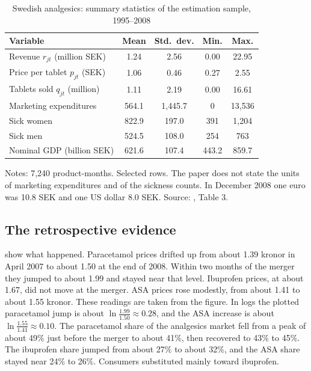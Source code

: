\begin{table}[htbp]
\centering
\caption{Swedish analgesics: summary statistics of the estimation sample, 1995--2008}
\label{tab:11-bv-sum}
\footnotesize
\begin{tabular}{@{}lcccc@{}}
\toprule
Variable & Mean & Std.\ dev. & Min. & Max. \\
\midrule
Revenue $r_{jt}$ (million SEK) & 1.24 & 2.56 & 0.00 & 22.95 \\
Price per tablet $p_{jt}$ (SEK) & 1.06 & 0.46 & 0.27 & 2.55 \\
Tablets sold $q_{jt}$ (million) & 1.11 & 2.19 & 0.00 & 16.61 \\
Marketing expenditures & 564.1 & 1{,}445.7 & 0 & 13{,}536 \\
Sick women & 822.9 & 197.0 & 391 & 1{,}204 \\
Sick men & 524.5 & 108.0 & 254 & 763 \\
Nominal GDP (billion SEK) & 621.6 & 107.4 & 443.2 & 859.7 \\
\bottomrule
\end{tabular}

\smallskip
\begin{minipage}{0.8\linewidth}
\footnotesize Notes: 7,240 product-months. Selected rows. The paper does not state the units of marketing
expenditures and of the sickness counts. In December 2008 one euro was 10.8 SEK and one US dollar 8.0 SEK. Source:
\citet{BjornerstedtVerboven2013}, Table 3.
\end{minipage}
\end{table}

\subsection{The retrospective evidence}\label{sec:11-bv-retro}

 show what happened. Paracetamol prices drifted up from about 1.39 kronor in
April 2007 to about 1.50 at the end of 2008. Within two months of the merger they jumped to about 1.99 and stayed
near that level. Ibuprofen prices, at about 1.67, did not move at the merger. ASA prices rose modestly, from about
1.41 to about 1.55 kronor. These readings are taken from the figure.
In logs the plotted paracetamol jump is about $\ln\frac{1.99}{1.50}\approx0.28$, and the ASA increase is about
$\ln\frac{1.55}{1.41}\approx0.10$. The paracetamol share of the analgesics market fell from a peak of about
49\% just before the merger to about 41\%, then recovered to 43\% to 45\%. The ibuprofen share jumped from about
27\% to about 32\%, and the ASA share stayed near 24\% to 26\%. Consumers substituted mainly toward ibuprofen.

